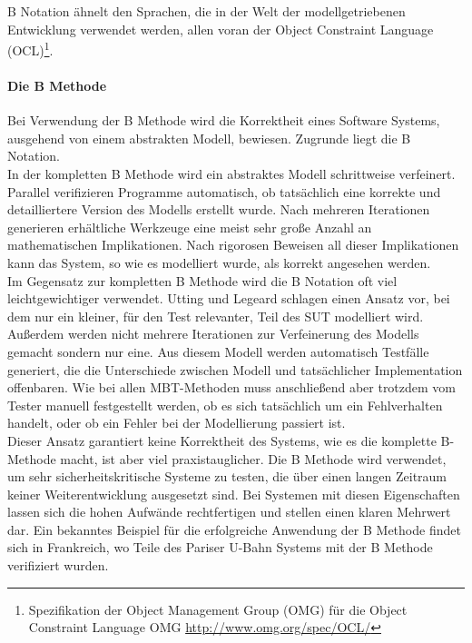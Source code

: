 B Notation ähnelt den Sprachen, die in der Welt der modellgetriebenen Entwicklung verwendet werden, allen voran der Object Constraint Language (OCL)\footnote{Spezifikation der Object Management Group (OMG) für die Object Constraint Language \cite{warmer_object_2004} OMG \url{http://www.omg.org/spec/OCL/}}.

\paragraph{Die B Methode}
\label{sec:bmethod}
Bei Verwendung der B Methode wird die Korrektheit eines Software Systems, ausgehend von einem abstrakten Modell, bewiesen. Zugrunde liegt die B Notation.\\
In der kompletten B Methode wird ein abstraktes Modell schrittweise verfeinert. Parallel verifizieren Programme automatisch, ob tatsächlich eine korrekte und detailliertere Version des Modells erstellt wurde. Nach mehreren Iterationen generieren erhältliche Werkzeuge eine meist sehr große Anzahl an mathematischen Implikationen. Nach rigorosen Beweisen all dieser Implikationen kann das System, so wie es modelliert wurde, als korrekt angesehen werden.\\
Im Gegensatz zur kompletten B Methode wird die B Notation oft viel leichtgewichtiger verwendet. Utting und Legeard \cite{utting_practical_2007} schlagen einen Ansatz vor, bei dem nur ein kleiner, für den Test relevanter, Teil des \Gls{SUT} modelliert wird. Außerdem werden nicht mehrere Iterationen zur Verfeinerung des Modells gemacht sondern nur eine. Aus diesem Modell werden automatisch Testfälle generiert, die die Unterschiede zwischen Modell und tatsächlicher Implementation offenbaren. Wie bei allen MBT-Methoden muss anschließend aber trotzdem vom Tester manuell festgestellt werden, ob es sich tatsächlich um ein Fehlverhalten handelt, oder ob ein Fehler bei der Modellierung passiert ist.\\
Dieser Ansatz garantiert keine Korrektheit des Systems, wie es die komplette B-Methode macht, ist aber viel praxistauglicher. Die B Methode wird verwendet, um sehr sicherheitskritische Systeme zu testen, die über einen langen Zeitraum keiner Weiterentwicklung ausgesetzt sind. Bei Systemen mit diesen Eigenschaften lassen sich die hohen Aufwände rechtfertigen und stellen einen klaren Mehrwert dar. Ein bekanntes Beispiel für die erfolgreiche Anwendung der B Methode findet sich in Frankreich, wo Teile des Pariser U-Bahn Systems mit der B Methode verifiziert wurden. \cite{lecomte_formal_2007}

